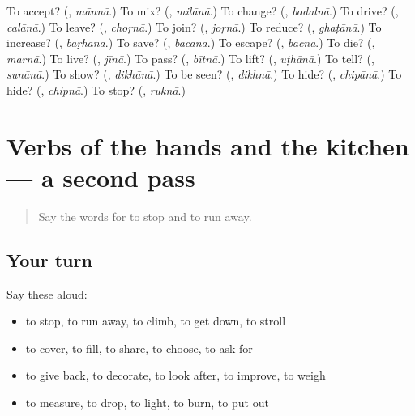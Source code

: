 \begin{tcolorbox}[breakable,colback=teal!4,colframe=teal!35!black,title={Before you move on}]
To accept? (\textbf{}, \emph{mānnā}.) To mix? (\textbf{}, \emph{milānā}.) To change? (\textbf{}, \emph{badalnā}.) To drive? (\textbf{}, \emph{calānā}.) To leave? (\textbf{}, \emph{choṛnā}.) To join? (\textbf{}, \emph{joṛnā}.) To reduce? (\textbf{}, \emph{ghaṭānā}.) To increase? (\textbf{}, \emph{baṛhānā}.) To save? (\textbf{}, \emph{bacānā}.) To escape? (\textbf{}, \emph{bacnā}.) To die? (\textbf{}, \emph{marnā}.) To live? (\textbf{}, \emph{jīnā}.) To pass? (\textbf{}, \emph{bītnā}.) To lift? (\textbf{}, \emph{uṭhānā}.) To tell? (\textbf{}, \emph{sunānā}.) To show? (\textbf{}, \emph{dikhānā}.) To be seen? (\textbf{}, \emph{dikhnā}.) To hide? (\textbf{}, \emph{chipānā}.) To hide? (\textbf{}, \emph{chipnā}.) To stop? (\textbf{}, \emph{ruknā}.)
\end{tcolorbox}
\section[(dialogue)]{Verbs of the hands and the kitchen — a second pass}

\label{lesson:HI-R175-second-pass-verbs-of-the-hands-and-the-kitchen}



\begin{quote}
Say the words for to stop and to run away.
\end{quote}

\subsection*{Your turn}
Say these aloud:

\begin{itemize}
\raggedright
  \item to stop, to run away, to climb, to get down, to stroll
  \item to cover, to fill, to share, to choose, to ask for
  \item to give back, to decorate, to look after, to improve, to weigh
  \item to measure, to drop, to light, to burn, to put out
\end{itemize}

